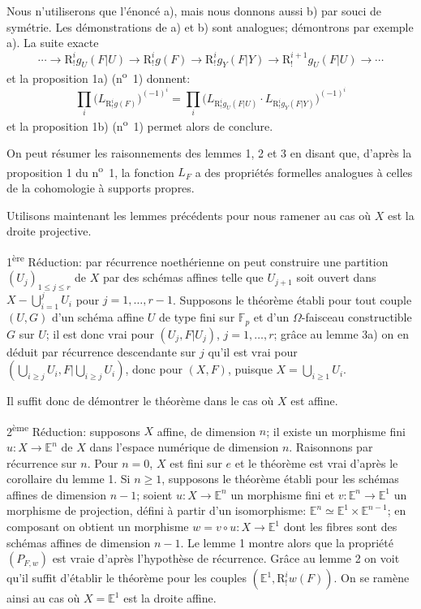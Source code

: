 \documentclass[11pt]{article}
\begin{document}
Nous n'utiliserons que l'énoncé a), mais nous donnons aussi b) par souci de symétrie. Les démonstrations de a) et b) sont analogues; démontrons par exemple a). La suite exacte
\[
\cdots\longrightarrow \mathrm{R}^i_!g_U(F|U)\longrightarrow \mathrm{R}^i_!g(F)
\longrightarrow \mathrm{R}^i_!g_Y(F|Y)\longrightarrow \mathrm{R}^{i+1}_!g_U(F|U)\longrightarrow\cdots
\]
et la proposition 1a) (n\textsuperscript{o}~1) donnent:
\[
\prod_i\bigl(L_{\mathrm{R}^i_!g(F)}\bigr)^{(-1)^i}
=\prod_i\bigl(L_{\mathrm{R}^i_!g_U(F|U)}\cdot L_{\mathrm{R}^i_!g_Y(F|Y)}\bigr)^{(-1)^i}
\]
et la proposition 1b) (n\textsuperscript{o}~1) permet alors de conclure.

On peut résumer les raisonnements des lemmes 1, 2 et 3 en disant que, d'après la proposition 1 du n\textsuperscript{o}~1, la fonction $L_F$ a des propriétés formelles analogues à celles de la cohomologie à supports 
propres.

Utilisons maintenant les lemmes précédents pour nous ramener au cas où $X$ est la droite projective.

1\textsuperscript{ère} Réduction: par récurrence noethérienne on peut construire une partition $(U_j)_{1\le j\le r}$ de $X$ par des schémas affines telle que $U_{j+1}$ soit ouvert dans $X-\bigcup_{i=1}^jU_i$ pour $j=1,\ldots,r-1$. Supposons le théorème établi pour tout couple $(U,G)$ d'un schéma affine $U$ de type fini sur $\mathbb F_p$ et d'un $\Omega$-faisceau constructible $G$ sur $U$; il est donc vrai pour $(U_j,F|U_j)$, $j=1,\ldots,r$; grâce au lemme 3a) on en déduit par récurrence descendante sur $j$ qu'il est vrai pour $(\bigcup_{i\ge j}U_i,F|\bigcup_{i\ge j}U_i)$, donc pour $(X,F)$, puisque $X=\bigcup_{i\ge1}U_i$.

Il suffit donc de démontrer le théorème dans le cas où $X$ est affine.

2\textsuperscript{ème} Réduction: supposons $X$ affine, de dimension $n$; il existe un morphisme fini $u:X\to\mathbb E^n$ de $X$ dans l'espace numérique de dimension $n$. Raisonnons par récurrence sur $n$. Pour $n=0$, $X$ est fini sur $e$ et le théorème est vrai d'après le corollaire du lemme 1. Si $n\ge1$, supposons le théorème établi pour les schémas affines de dimension $n-1$; soient $u:X\to\mathbb E^n$ un morphisme fini et $v:\mathbb E^n\to\mathbb E^1$ un morphisme de projection, défini à partir d'un isomorphisme: $\mathbb E^n\simeq\mathbb E^1\times\mathbb E^{n-1}$; en composant on obtient un morphisme $w=v\circ u:X\to\mathbb E^1$ dont les fibres sont des schémas affines de dimension $n-1$. Le lemme 1 montre alors que la propriété $(P_{F,w})$ est vraie d'après l'hypothèse de récurrence. Grâce au lemme 2 on voit qu'il suffit d'établir le théorème pour les couples 
$(\mathbb E^1,\mathrm{R}^i_!w(F))$. On se ramène
ainsi au cas où $X=\mathbb E^1$ est la droite affine.
\end{document}
